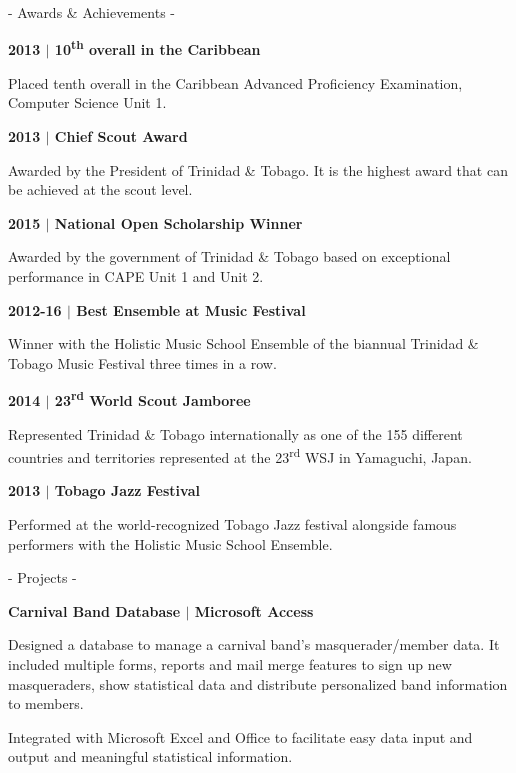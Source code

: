 \documentclass[twocolumn]{article}
\newcommand{\ts}{\textsuperscript}
\begin{document}
\begin{twocolumn}
{\Large\sc - Awards \& Achievements -} \smallskip\par
{\sffamily\bf 2013 $|$ {\large 10\ts{th} overall in the Caribbean}}\par
{\selectfont Placed tenth overall in the Caribbean Advanced Proficiency Examination, Computer Science Unit 1.}\par
{\sffamily\bf 2013 $|$ {\large Chief Scout Award}}\par
{\selectfont Awarded by the President of Trinidad \& Tobago. It is the highest award that can be achieved at the scout level.}\par
{\sffamily\bf 2015 $|$ {\large National Open Scholarship Winner}}\par
{\selectfont Awarded by the government of Trinidad \& Tobago based on exceptional performance in CAPE Unit 1 and Unit 2.}\par
{\sffamily\bf 2012-16 $|$ {\large Best Ensemble at Music Festival}}\par
{\selectfont Winner with the Holistic Music School Ensemble of the biannual Trinidad \& Tobago Music Festival three times in a row.}\par
{\sffamily\bf 2014 $|$ {\large 23\ts{rd} World Scout Jamboree}}\par
{\selectfont Represented Trinidad \& Tobago internationally as one of the 155 different countries and territories represented at the 23\ts{rd} WSJ in  Yamaguchi, Japan.}\par
{\sffamily\bf 2013 $|$ {\large Tobago Jazz Festival}}\par
{\selectfont Performed at the world-recognized Tobago Jazz festival alongside famous performers with the Holistic Music School Ensemble.}\par
\newpage

{\Large\sc - Projects -} \smallskip\par
{\sffamily\bf\small {\large Carnival Band Database $|$} Microsoft Access}\par
{\selectfont Designed a database to manage a carnival band's masquerader/member data. It included multiple forms, reports and mail merge features to sign up new masqueraders, show statistical data and distribute personalized band information to members.\par
Integrated with Microsoft Excel and Office to facilitate easy data input and output and meaningful statistical information.}\par
\medskip


\end{twocolumn}
\end{document}
